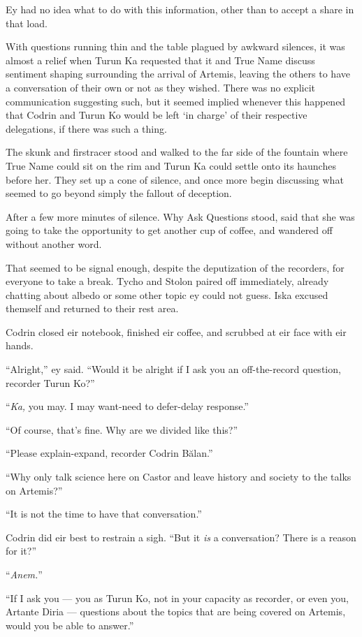 Ey had no idea what to do with this information, other than to accept a share in that load.

With questions running thin and the table plagued by awkward silences, it was almost a relief when Turun Ka requested that it and True Name discuss sentiment shaping surrounding the arrival of Artemis, leaving the others to have a conversation of their own or not as they wished. There was no explicit communication suggesting such, but it seemed implied whenever this happened that Codrin and Turun Ko would be left `in charge' of their respective delegations, if there was such a thing.

The skunk and firstracer stood and walked to the far side of the fountain where True Name could sit on the rim and Turun Ka could settle onto its haunches before her. They set up a cone of silence, and once more begin discussing what seemed to go beyond simply the fallout of deception.

After a few more minutes of silence. Why Ask Questions stood, said that she was going to take the opportunity to get another cup of coffee, and wandered off without another word.

That seemed to be signal enough, despite the deputization of the recorders, for everyone to take a break. Tycho and Stolon paired off immediately, already chatting about albedo or some other topic ey could not guess. Iska excused themself and returned to their rest area.

Codrin closed eir notebook, finished eir coffee, and scrubbed at eir face with eir hands.

``Alright,'' ey said. ``Would it be alright if I ask you an off-the-record question, recorder Turun Ko?''

``\emph{Ka,} you may. I may want-need to defer-delay response.''

``Of course, that's fine. Why are we divided like this?''

``Please explain-expand, recorder Codrin Bălan.''

``Why only talk science here on Castor and leave history and society to the talks on Artemis?''

``It is not the time to have that conversation.''

Codrin did eir best to restrain a sigh. ``But it \emph{is} a conversation? There is a reason for it?''

``\emph{Anem.}''

``If I ask you — you as Turun Ko, not in your capacity as recorder, or even you, Artante Diria — questions about the topics that are being covered on Artemis, would you be able to answer.''

